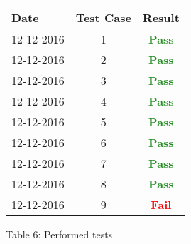 \documentclass{article}
\begin{document}
\begin{center}
\begin{tabular}{|l|c|c|}
\hline
\textbf{Date} & \textbf{Test Case} & \textbf{Result} \\ \hline
12-12-2016 & 1 & \textcolor{ForestGreen}{\textbf{Pass}} \\ \hline
12-12-2016 & 2 & \textcolor{ForestGreen}{\textbf{Pass}} \\ \hline
12-12-2016 & 3 & \textcolor{ForestGreen}{\textbf{Pass}} \\ \hline
12-12-2016 & 4 & \textcolor{ForestGreen}{\textbf{Pass}} \\ \hline
12-12-2016 & 5 & \textcolor{ForestGreen}{\textbf{Pass}} \\ \hline
12-12-2016 & 6 & \textcolor{ForestGreen}{\textbf{Pass}} \\ \hline
12-12-2016 & 7 & \textcolor{ForestGreen}{\textbf{Pass}} \\ \hline
12-12-2016 & 8 & \textcolor{ForestGreen}{\textbf{Pass}} \\ \hline
12-12-2016 & 9 & \textcolor{Red}{\textbf{Fail}} \\ \hline
\end{tabular}
\end{center}
\begin{center}
\caption{Table 6: Performed tests}
\end{center}
\end{document}
